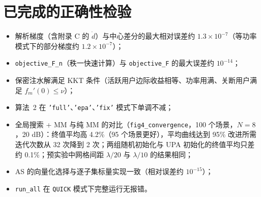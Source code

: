 \documentclass[11pt,a4paper]{ctexart}
\newcommand{\code}[1]{\texttt{#1}}
\begin{document}
\section{已完成的正确性检验}
\begin{itemize}
\item 解析梯度（含附录 C 的 $\dot d$）与中心差分的最大相对误差约 $1.3\times10^{-7}$（等功率模式下的部分梯度约 $1.2\times10^{-7}$）；
\item \code{objective\_F\_n}（秩一快速计算）与 \code{objective\_F} 的最大误差约 $10^{-14}$；
\item 保密注水解满足 KKT 条件（活跃用户边际收益相等、功率用满、关断用户满足 $f_m'(0)\le\nu$）；
\item 算法~2 在 \code{'full'}、\code{'epa'}、\code{'fix'} 模式下单调不减；
\item 全局搜索 + MM 与纯 MM 的对比（\code{fig4\_convergence}，100 个场景，$N=8$，20 dB）：终值平均高 4.2\%（95 个场景更好），平均曲线达到 95\% 改进所需迭代次数从 32 次降到 2 次；两组随机初始化与 UPA 初始化的终值平均只差约 0.1\%；预实验中网格间距 $\lambda/20$ 与 $\lambda/10$ 的结果相同；
\item AS 的向量化选择与逐子集标量实现一致（相对误差约 $10^{-15}$）；
\item \code{run\_all} 在 \code{QUICK} 模式下完整运行无报错。
\end{itemize}
\end{document}
